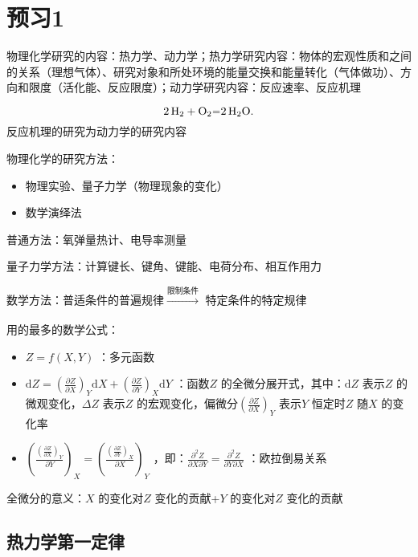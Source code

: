 \section*{预习1}%
\label{sec:预习1}
物理化学研究的内容：热力学、动力学；热力学研究内容：物体的宏观性质和之间的关系（理想气体）、研究对象和所处环境的能量交换和能量转化（气体做功）、方向和限度（活化能、反应限度）；动力学研究内容：反应速率、反应机理
\begin{eg}
    \[
        \ce{2H_2 +O_2=2H_2O} 
    .\]
    反应机理的研究为动力学的研究内容
\end{eg}
物理化学的研究方法：
\begin{itemize}
    \item 物理实验、量子力学（物理现象的变化）
    \item 数学演绎法
    
\end{itemize}
\begin{eg}
    普通方法：氧弹量热计、电导率测量

    量子力学方法：计算键长、键角、键能、电荷分布、相互作用力

    数学方法：普适条件的普遍规律$\xrightarrow[]{\text{限制条件}}$ 特定条件的特定规律
\end{eg}
用的最多的数学公式：
\begin{itemize}
    \item $Z=f\left( X,Y \right)$ ：多元函数
    \item $\mathrm{d}Z=\left(\frac{\partial Z}{\partial X}\right)_{Y}\mathrm{d}X+\left(\frac{\partial Z}{\partial Y}\right)_{X}\mathrm{d}Y$ ：函数$Z$ 的全微分展开式，其中：$\mathrm{d}Z$ 表示$Z$ 的微观变化，$\Delta Z$ 表示$Z$ 的宏观变化，偏微分$\left(\frac{\partial Z}{\partial X}\right)_{Y}$ 表示$Y$ 恒定时$Z$ 随$X$ 的变化率
    \item $\left(\frac{\left(\frac{\partial Z}{\partial X}\right)_{Y}}{\partial Y}\right)_{X} = \left(\frac{\left(\frac{\partial Z}{\partial Y}\right)_{X}}{\partial X}\right)_{Y}$ ，即：$\frac{\partial^2 Z}{\partial X\partial Y} = \frac{\partial^2 Z}{\partial Y\partial X}$ ：欧拉倒易关系
\end{itemize}
\begin{notation}
    全微分的意义：$X$ 的变化对$Z$ 变化的贡献+$Y$ 的变化对$Z$ 变化的贡献
\end{notation}
\subsection*{热力学第一定律}%
\label{sub*:热力学第一定律}
